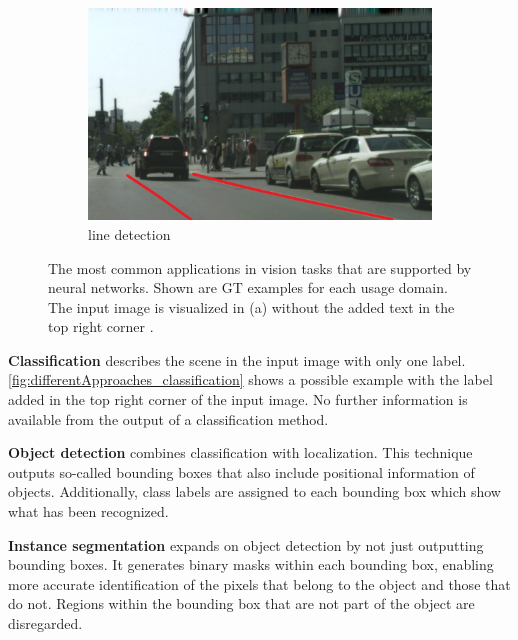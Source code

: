 \begin{figure}[H]
    \hfill
    \begin{subfigure}{0.328\textwidth}
        \includegraphics[width=\linewidth]{PICs/differentApproaches/line_detection.jpg}
        \caption{line detection}
        \label{fig:differentApproaches_line_detection}
    \end{subfigure}

    \caption{The most common applications in vision tasks that are supported by neural networks. Shown are \ac{GT} examples for each usage domain. The input image is visualized in (a) without the added text in the top right corner \cite{panopticsegmentation2019}.}
    \label{fig:differentApproaches}
\end{figure}

\clearpage
\noindent\textbf{Classification} describes the scene in the input image with only one label.
\autoref{fig:differentApproaches_classification} shows a possible example with the label added in the top right corner of the input image.
No further information is available from the output of a classification method.

\vspace{1cm} %

\noindent\textbf{Object detection} combines classification with localization.
This technique outputs so-called bounding boxes that also include positional information of objects.
Additionally, class labels are assigned to each bounding box which show what has been recognized.

\vspace{1cm} %

\noindent\textbf{Instance segmentation} expands on object detection by not just outputting bounding boxes.
It generates binary masks within each bounding box, enabling more accurate identification of the pixels that belong to the object and those that do not.
Regions within the bounding box that are not part of the object are disregarded.

